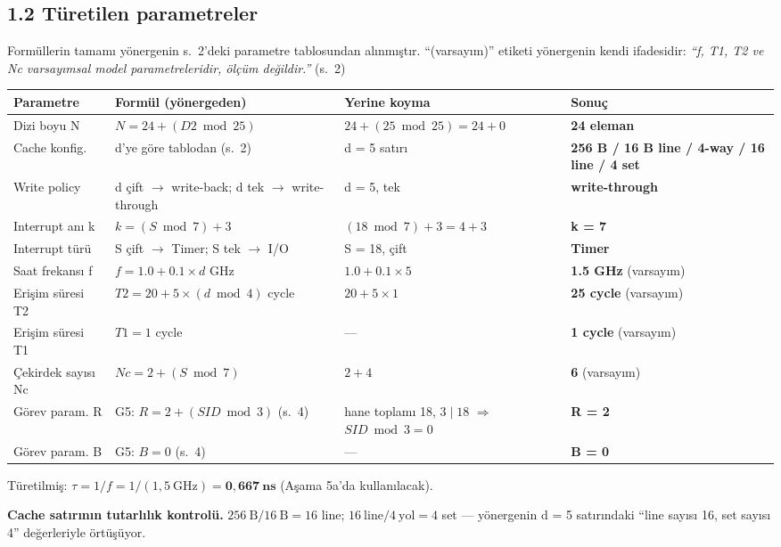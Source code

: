 \documentclass[11pt,a4paper]{article}
\begin{document}
\subsection*{1.2 Türetilen parametreler}

Formüllerin tamamı yönergenin s.~2'deki parametre tablosundan alınmıştır. ``(varsayım)'' etiketi
yönergenin kendi ifadesidir: \textit{``f, T1, T2 ve Nc varsayımsal model parametreleridir, ölçüm
değildir.''} (s.~2)

\begin{longtable}{p{2.9cm}p{4.9cm}p{4.2cm}p{3.1cm}}
\toprule
\textbf{Parametre} & \textbf{Formül (yönergeden)} & \textbf{Yerine koyma} & \textbf{Sonuç}\\
\midrule
\endhead
Dizi boyu N & $N = 24 + (D2 \bmod 25)$ & $24 + (25 \bmod 25) = 24+0$ & \textbf{24 eleman}\\
Cache konfig. & d'ye göre tablodan (s.~2) & d = 5 satırı & \textbf{256 B / 16 B line / 4-way / 16 line / 4 set}\\
Write policy & d çift $\rightarrow$ write-back; d tek $\rightarrow$ write-through & d = 5, tek & \textbf{write-through}\\
Interrupt anı k & $k = (S \bmod 7) + 3$ & $(18 \bmod 7)+3 = 4+3$ & \textbf{k = 7}\\
Interrupt türü & S çift $\rightarrow$ Timer; S tek $\rightarrow$ I/O & S = 18, çift & \textbf{Timer}\\
Saat frekansı f & $f = 1.0 + 0.1 \times d$ GHz & $1.0 + 0.1 \times 5$ & \textbf{1.5 GHz} (varsayım)\\
Erişim süresi T2 & $T2 = 20 + 5 \times (d \bmod 4)$ cycle & $20 + 5 \times 1$ & \textbf{25 cycle} (varsayım)\\
Erişim süresi T1 & $T1 = 1$ cycle & --- & \textbf{1 cycle} (varsayım)\\
Çekirdek sayısı Nc & $Nc = 2 + (S \bmod 7)$ & $2 + 4$ & \textbf{6} (varsayım)\\
\midrule
Görev param. R & G5: $R = 2 + (SID \bmod 3)$ (s.~4) & hane toplamı 18, $3 \mid 18$ $\Rightarrow$ $SID \bmod 3 = 0$ & \textbf{R = 2}\\
Görev param. B & G5: $B = 0$ (s.~4) & --- & \textbf{B = 0}\\
\bottomrule
\end{longtable}

Türetilmiş: $\tau = 1/f = 1/(1{,}5\ \text{GHz}) = \mathbf{0{,}667\ \text{ns}}$ (Aşama 5a'da kullanılacak).

\textbf{Cache satırının tutarlılık kontrolü.} $256\ \text{B} / 16\ \text{B} = 16$ line;
$16\ \text{line} / 4\ \text{yol} = 4$ set --- yönergenin d = 5 satırındaki ``line sayısı 16,
set sayısı 4'' değerleriyle örtüşüyor. \checkmark
\end{document}
